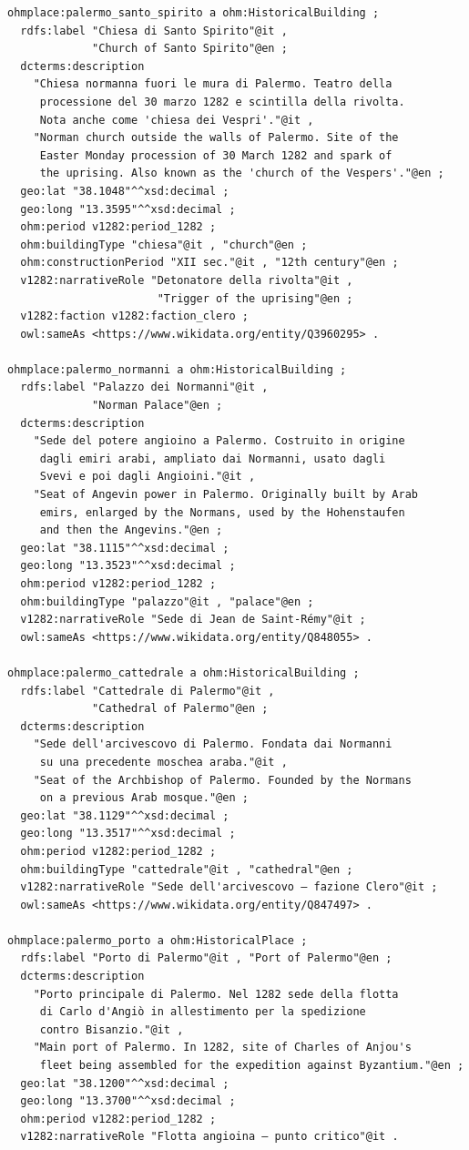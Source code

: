 \begin{verbatim}
ohmplace:palermo_santo_spirito a ohm:HistoricalBuilding ;
  rdfs:label "Chiesa di Santo Spirito"@it ,
             "Church of Santo Spirito"@en ;
  dcterms:description
    "Chiesa normanna fuori le mura di Palermo. Teatro della
     processione del 30 marzo 1282 e scintilla della rivolta.
     Nota anche come 'chiesa dei Vespri'."@it ,
    "Norman church outside the walls of Palermo. Site of the
     Easter Monday procession of 30 March 1282 and spark of
     the uprising. Also known as the 'church of the Vespers'."@en ;
  geo:lat "38.1048"^^xsd:decimal ;
  geo:long "13.3595"^^xsd:decimal ;
  ohm:period v1282:period_1282 ;
  ohm:buildingType "chiesa"@it , "church"@en ;
  ohm:constructionPeriod "XII sec."@it , "12th century"@en ;
  v1282:narrativeRole "Detonatore della rivolta"@it ,
                       "Trigger of the uprising"@en ;
  v1282:faction v1282:faction_clero ;
  owl:sameAs <https://www.wikidata.org/entity/Q3960295> .

ohmplace:palermo_normanni a ohm:HistoricalBuilding ;
  rdfs:label "Palazzo dei Normanni"@it ,
             "Norman Palace"@en ;
  dcterms:description
    "Sede del potere angioino a Palermo. Costruito in origine
     dagli emiri arabi, ampliato dai Normanni, usato dagli
     Svevi e poi dagli Angioini."@it ,
    "Seat of Angevin power in Palermo. Originally built by Arab
     emirs, enlarged by the Normans, used by the Hohenstaufen
     and then the Angevins."@en ;
  geo:lat "38.1115"^^xsd:decimal ;
  geo:long "13.3523"^^xsd:decimal ;
  ohm:period v1282:period_1282 ;
  ohm:buildingType "palazzo"@it , "palace"@en ;
  v1282:narrativeRole "Sede di Jean de Saint-Rémy"@it ;
  owl:sameAs <https://www.wikidata.org/entity/Q848055> .

ohmplace:palermo_cattedrale a ohm:HistoricalBuilding ;
  rdfs:label "Cattedrale di Palermo"@it ,
             "Cathedral of Palermo"@en ;
  dcterms:description
    "Sede dell'arcivescovo di Palermo. Fondata dai Normanni
     su una precedente moschea araba."@it ,
    "Seat of the Archbishop of Palermo. Founded by the Normans
     on a previous Arab mosque."@en ;
  geo:lat "38.1129"^^xsd:decimal ;
  geo:long "13.3517"^^xsd:decimal ;
  ohm:period v1282:period_1282 ;
  ohm:buildingType "cattedrale"@it , "cathedral"@en ;
  v1282:narrativeRole "Sede dell'arcivescovo — fazione Clero"@it ;
  owl:sameAs <https://www.wikidata.org/entity/Q847497> .

ohmplace:palermo_porto a ohm:HistoricalPlace ;
  rdfs:label "Porto di Palermo"@it , "Port of Palermo"@en ;
  dcterms:description
    "Porto principale di Palermo. Nel 1282 sede della flotta
     di Carlo d'Angiò in allestimento per la spedizione
     contro Bisanzio."@it ,
    "Main port of Palermo. In 1282, site of Charles of Anjou's
     fleet being assembled for the expedition against Byzantium."@en ;
  geo:lat "38.1200"^^xsd:decimal ;
  geo:long "13.3700"^^xsd:decimal ;
  ohm:period v1282:period_1282 ;
  v1282:narrativeRole "Flotta angioina — punto critico"@it .


\end{verbatim}
